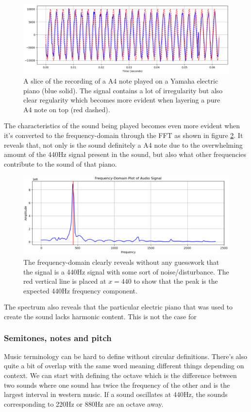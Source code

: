 \begin{figure}[ht]
    \centering
    \includegraphics[width=\textwidth]{./images/piano_wave.png}
    \caption{A slice of the recording of a A4 note played on a Yamaha electric piano (blue solid). The signal contains a lot of irregularity but also clear regularity which becomes more evident when layering a pure A4 note on top (red dashed).\label{fig:pianoWave}}
\end{figure}

The characteristics of the sound being played becomes even more evident when it's converted to the frequency-domain through the FFT as shown in figure \ref{fig:pianoFreq}. It reveals that, not only is the sound definitely a A4 note due to the overwhelming amount of the 440Hz signal present in the sound, but also what other frequencies contribute to the sound of that piano. 

\begin{figure}[ht]
    \centering
    \includegraphics[width=\textwidth]{./images/piano_freq.png}
    \caption{The frequency-domain clearly reveals without any guesswork that the signal is a 440Hz signal with some sort of noise/disturbance. The red vertical line is placed at $x=440$ to show that the peak is the expected 440Hz frequency component.\label{fig:pianoFreq}}
\end{figure}

The spectrum also reveals that the particular electric piano that was used to create the sound lacks harmonic content. This is not the case for  

\subsubsection{Semitones, notes and pitch} 
Music terminology can be hard to define without circular definitions. There's also quite a bit of overlap with the same word meaning different things depending on context. We can start with defining the octave which is the difference between two sounds where one sound has twice the frequency of the other and is the largest interval in western music. If a sound oscillates at 440Hz, the sounds corresponding to 220Hz or 880Hz are an octave away.

